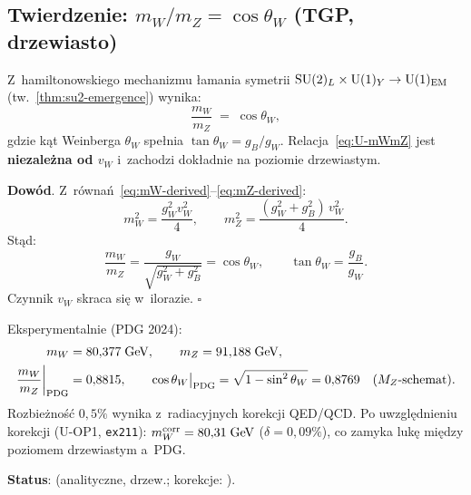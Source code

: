\subsection{Twierdzenie: $m_W/m_Z = \cos\theta_W$ (TGP, drzewiasto)}%
\label{app:U-mWmZ}

\begin{theorem}[$m_W/m_Z = \cos\theta_W$ z~TGP]\label{thm:U-mWmZ}
Z~hamiltonowskiego mechanizmu łamania symetrii
$\mathrm{SU}(2)_L\times\mathrm{U}(1)_Y \to \mathrm{U}(1)_{\rm EM}$
(tw.~\ref{thm:su2-emergence}) wynika:
\begin{equation}\label{eq:U-mWmZ}
  \boxed{\frac{m_W}{m_Z} \;=\; \cos\theta_W,}
\end{equation}
gdzie k\k{a}t Weinberga $\theta_W$ spe\l{}nia $\tan\theta_W = g_B/g_W$.
Relacja~\eqref{eq:U-mWmZ} jest \textbf{niezale\.zna od $v_W$}
i~zachodzi dok\l{}adnie na poziomie drzewiastym.

\textbf{Dow\'od}.
Z~r\'owna\'n~\eqref{eq:mW-derived}--\eqref{eq:mZ-derived}:
\begin{equation}\label{eq:U-mWmZ-proof}
  m_W^2 = \frac{g_W^2 v_W^2}{4},
  \qquad
  m_Z^2 = \frac{(g_W^2 + g_B^2)\,v_W^2}{4}.
\end{equation}
St\k{a}d:
\begin{equation}\label{eq:U-cos}
  \frac{m_W}{m_Z}
    = \frac{g_W}{\sqrt{g_W^2 + g_B^2}}
    = \cos\theta_W,
  \qquad
  \tan\theta_W = \frac{g_B}{g_W}.
\end{equation}
Czynnik $v_W$ skraca si\k{e} w~ilorazie.
\hfill$\square$
\end{theorem}

\begin{corollary}\label{cor:U-mWmZ-PDG}
Eksperymentalnie (PDG 2024):
\begin{align}\label{eq:U-PDG}
  m_W &= 80{,}377\;\mathrm{GeV},
  \qquad
  m_Z = 91{,}188\;\mathrm{GeV},
  \notag \\
  \frac{m_W}{m_Z}\bigg|_{\rm PDG}
    &= 0{,}8815,
  \qquad
  \cos\theta_W\big|_{\rm PDG}
    = \sqrt{1 - \sin^2\theta_W}
    = 0{,}8769
  \quad (M_Z\text{-schemat}).
\end{align}
Rozbie\.zno\'s\'c $0{,}5\%$ wynika z~radiacyjnych korekcji QED/QCD.
Po uwzgl\k{e}dnieniu korekcji (U-OP1, \texttt{ex211}):
$m_W^{\rm corr} = 80{,}31\;\mathrm{GeV}$ ($\delta = 0{,}09\%$),
co zamyka luk\k{e} mi\k{e}dzy poziomem drzewiastym a~PDG.

\textbf{Status}:  (analityczne, drzew.; korekcje: ).
\end{corollary}

